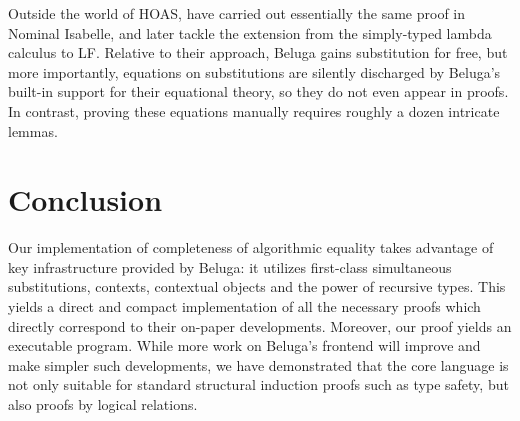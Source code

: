 \documentclass[copyright,creativecommons]{eptcs}
\begin{document}
Outside the world of HOAS, \cite{Narboux:LFMTP08} have carried out essentially the same proof in
Nominal Isabelle, and later \cite{Urban:TOCL11} tackle the extension from the simply-typed
lambda calculus to LF. Relative to their
approach, Beluga gains substitution for free, but
more importantly, equations on substitutions are silently discharged
 by Beluga's built-in support for their equational theory, so they do not
 even appear in proofs. In contrast, proving
these equations manually requires roughly a dozen intricate lemmas.

\section{Conclusion}
Our implementation of completeness of algorithmic equality takes advantage of key infrastructure provided by Beluga: it utilizes first-class simultaneous substitutions, contexts, contextual objects and the power of recursive types. This yields a direct and compact implementation of all the necessary proofs which directly correspond to their on-paper developments. Moreover, our proof yields an executable program. 
While more work on Beluga's frontend will improve and make simpler such developments, we have demonstrated that the core language is not only suitable for standard structural induction proofs such as type safety, but also proofs by logical relations. 



\end{document}
